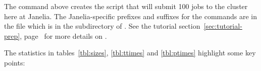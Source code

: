 



The  command above creates the
 script that will submit 100 
jobs to the cluster here at Janelia. The Janelia-specific prefixes and
suffixes for the commands are in the file
 which is in the 
subdirectory of . See the tutorial
section~\ref{sec:tutorial-prep}, 
page~\pageref{sec:tutorial-prep} for more details on .

The statistics in tables~\ref{tbl:sizes}, \ref{tbl:ttimes} and
\ref{tbl:ptimes} highlight some key points:

